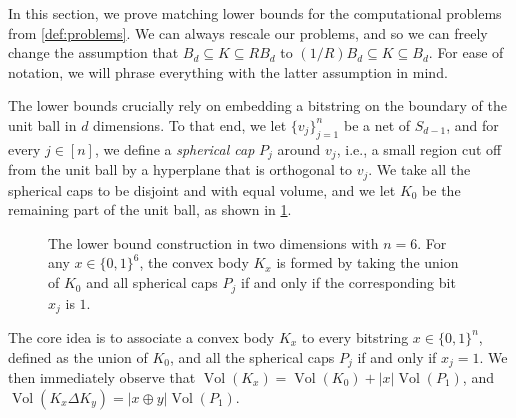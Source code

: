 \documentclass[11pt]{article}
\DeclareMathOperator{\Vol}{Vol}
\begin{document}
    In this section, we prove matching lower bounds for the computational problems from \cref{def:problems}. We can always rescale our problems, and so we can freely change the assumption that $B_d \subseteq K \subseteq RB_d$ to $(1/R)B_d \subseteq K \subseteq B_d$. For ease of notation, we will phrase everything with the latter assumption in mind.

    The lower bounds crucially rely on embedding a bitstring on the boundary of the unit ball in $d$ dimensions. To that end, we let $\{v_j\}_{j=1}^n$ be a net of $S_{d-1}$, and for every $j \in [n]$, we define a \textit{spherical cap} $P_j$ around $v_j$, i.e., a small region cut off from the unit ball by a hyperplane that is orthogonal to $v_j$. We take all the spherical caps to be disjoint and with equal volume, and we let $K_0$ be the remaining part of the unit ball, as shown in \cref{fig:lb-construction}.

    \begin{figure}[!ht]
        \centering
        \caption{The lower bound construction in two dimensions with $n = 6$. For any $x \in \{0,1\}^6$, the convex body $K_x$ is formed by taking the union of $K_0$ and all spherical caps $P_j$ if and only if the corresponding bit $x_j$ is $1$.}
        \label{fig:lb-construction}
    \end{figure}

    The core idea is to associate a convex body $K_x$ to every bitstring $x \in \{0,1\}^n$, defined as the union of $K_0$, and all the spherical caps $P_j$ if and only if $x_j = 1$. We then immediately observe that $\Vol(K_x) = \Vol(K_0) + |x|\Vol(P_1)$, and $\Vol(K_x \Delta K_y) = |x \oplus y| \Vol(P_1)$.
\end{document}
